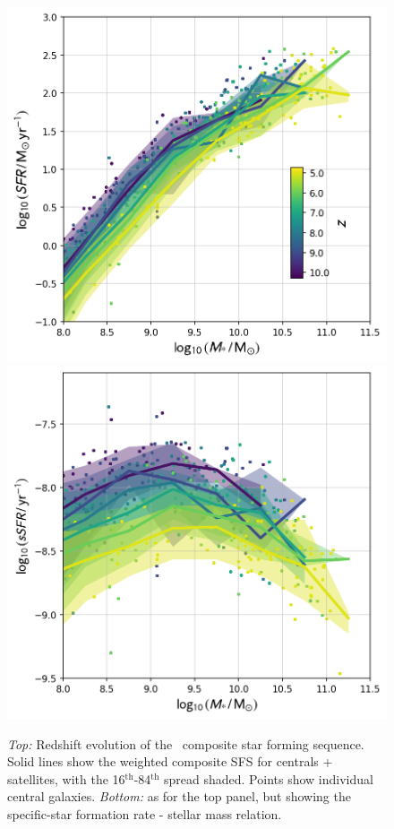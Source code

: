 \begin{figure}
	\includegraphics[width=\columnwidth]{images/sfs_all.png}
  \includegraphics[width=\columnwidth]{images/ssfr_all.png}
    \caption{\textit{Top:} Redshift evolution of the \flares\ composite star forming sequence.
    Solid lines show the weighted composite SFS for centrals + satellites, with the 16$^{\mathrm{th}}$-84$^{\mathrm{th}}$ spread shaded.
    Points show individual central galaxies.
    \textit{Bottom:} as for the top panel, but showing the specific-star formation rate - stellar mass relation.
    }
    \label{fig:sfs_all}
\end{figure}

